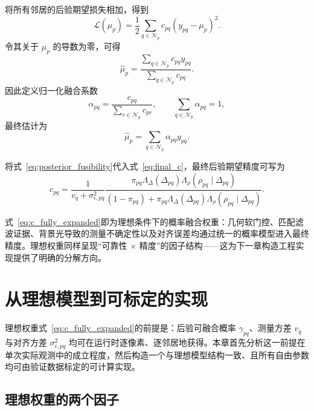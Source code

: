 \documentclass[11pt,a4paper]{ctexart}
\numberwithin{equation}{section}
\begin{document}
将所有邻居的后验期望损失相加，得到
\begin{equation}
    \mathcal L(\mu_p)
    =
    \frac12
    \sum_{q\in\mathcal N_p}
    c_{pq}(y_{pq}-\mu_p)^2.
    \label{eq:global_loss}
\end{equation}
令其关于 $\mu_p$ 的导数为零，可得
\begin{equation}
    \hat\mu_p
    =
    \frac{
    \sum_{q\in\mathcal N_p}c_{pq}y_{pq}
    }{
    \sum_{q\in\mathcal N_p}c_{pq}
    }.
    \label{eq:fused_mu}
\end{equation}
因此定义归一化融合系数
\begin{equation}
    \alpha_{pq}
    =
    \frac{c_{pq}}
    {\sum_{r\in\mathcal N_p}c_{pr}},
    \qquad
    \sum_{q\in\mathcal N_p}\alpha_{pq}=1,
    \label{eq:alpha_final}
\end{equation}
最终估计为
\begin{equation}
    \hat\mu_p
    =
    \sum_{q\in\mathcal N_p}
    \alpha_{pq}y_{pq}.
    \label{eq:fused_mu_alpha}
\end{equation}

将式~\eqref{eq:posterior_fusibility}代入式~\eqref{eq:final_c}，最终后验期望精度可写为
\begin{equation}
    \boxed{
    c_{pq}
    =
    \frac{1}{v_q+\sigma_{\epsilon,pq}^{2}}
    \frac{
    \pi_{pq}
    \Lambda_{\Delta}(\Delta_{pq})
    \Lambda_{\rho}(\rho_{pq}\mid\Delta_{pq})
    }{
    (1-\pi_{pq})
    +
    \pi_{pq}
    \Lambda_{\Delta}(\Delta_{pq})
    \Lambda_{\rho}(\rho_{pq}\mid\Delta_{pq})
    }
    }.
    \label{eq:c_fully_expanded}
\end{equation}

式~\eqref{eq:c_fully_expanded}即为理想条件下的概率融合权重：几何软门控、匹配滤波证据、背景光导致的测量不确定性以及对齐误差均通过统一的概率模型进入最终精度。理想权重同样呈现``可靠性 $\times$ 精度''的因子结构——这为下一章构造工程实现提供了明确的分解方向。

\section{从理想模型到可标定的实现}
\label{sec:practical_approximation}

理想权重式~\eqref{eq:c_fully_expanded}的前提是：后验可融合概率 $\gamma_{pq}$、测量方差 $v_q$ 与对齐方差 $\sigma_{\epsilon,pq}^{2}$ 均可在运行时逐像素、逐邻居地获得。本章首先分析这一前提在单次实际观测中的成立程度，然后构造一个与理想模型结构一致、且所有自由参数均可由验证数据标定的可计算实现。

\subsection{理想权重的两个因子}
\end{document}
